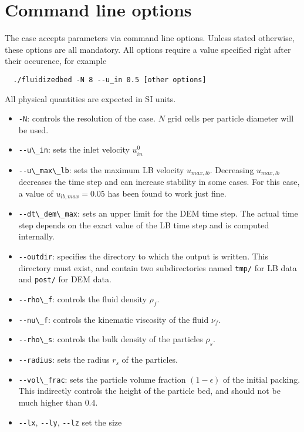 \documentclass[12pt]{article}
\newcommand{\cloption}[1]{\lstinline{#1}}
\begin{document}
\section{Command line options} \label{sect:cloptions}

The case accepts parameters via command line options. Unless stated
otherwise, these options are all mandatory. All options require a
value specified right after their occurence, for example
\begin{lstlisting}
  ./fluidizedbed -N 8 --u_in 0.5 [other options]
\end{lstlisting}
All physical quantities are expected in SI units. \\

\begin{itemize}
  \item \cloption{-N}: controls the resolution of the
    case. $N$ grid cells per particle diameter will be used.
  \item \cloption{--u\_in}: sets the inlet velocity $u_{in}^0$
  \item \cloption{--u\_max\_lb}: sets the maximum LB velocity
    $u_{max,lb}$. Decreasing $u_{max,lb}$ decreases the time step and
    can increase stability in some cases. For this case, a value of
    $u_{lb,max} = 0.05$ has been found to work just fine.
  \item \cloption{--dt\_dem\_max}: sets an upper limit for the DEM
    time step. The actual time step depends on the exact value of the
    LB time step and is computed internally.
  \item \cloption{--outdir}: specifies the directory to which the
    output is written. This directory must exist, and contain two
    subdirectories named \lstinline{tmp/} for LB data and
    \lstinline{post/} for DEM data.
  \item \cloption{--rho\_f}: controls the fluid density $\rho_f$.
  \item \cloption{--nu\_f}: controls the kinematic viscosity of the
    fluid $\nu_f$.
  \item \cloption{--rho\_s}: controls the bulk density of the
    particles $\rho_s$.
  \item \cloption{--radius}: sets the radius $r_s$ of the particles.
  \item \cloption{--vol\_frac}: sets the particle volume fraction
    $(1-\epsilon)$ of the initial packing. This indirectly controls
    the height of the particle bed, and should not be much higher than
    $0.4$.
  \item \cloption{--lx}, \cloption{--ly}, \cloption{--lz} set the size

\end{itemize}
\end{document}
